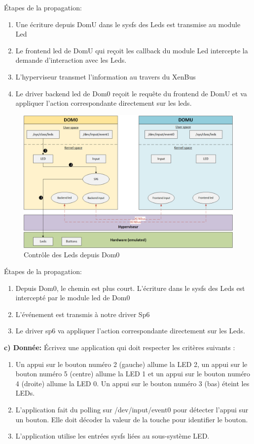 Étapes de la propagation:
\begin{enumerate}
	\item Une écriture depuis DomU dans le sysfs des Leds est transmise au module Led
	\item Le frontend led de DomU qui reçoit les callback du module Led intercepte la demande d'interaction avec les Leds.
	\item L'hyperviseur transmet l'information au travers du XenBus
	\item Le driver backend led de Dom0 reçoit le requête du frontend de DomU et va appliquer l'action correspondante directement sur les leds.
\end{enumerate}
\begin{figure}[H]
	\begin{center}
		\includegraphics[width=17cm]{img/virt4.png}
		\caption{Contrôle des Leds depuis Dom0}
		\label{virt4}
	\end{center}
\end{figure}
Étapes de la propagation:
\begin{enumerate}
	\item Depuis Dom0, le chemin est plus court. L'écriture dans le sysfs des Leds est intercepté par le module led de Dom0
	\item L'événement est transmis à notre driver Sp6
	\item Le driver sp6 va appliquer l'action correspondante directement sur les Leds.\\
\end{enumerate}
\textbf{c) Donnée: }Écrivez une application qui doit respecter les critères suivants :
\begin{enumerate}
	\item Un appui sur le bouton numéro 2 (gauche) allume la LED 2, un appui sur le bouton numéro 5 (centre)
	allume la LED 1 et un appui sur le bouton numéro 4 (droite) allume la LED 0. Un appui sur le
	bouton numéro 3 (bas) éteint les LEDs.
	\item L’application fait du polling sur /dev/input/event0 pour détecter l’appui sur un bouton. Elle
	doit décoder la valeur de la touche pour identifier le bouton.
	\item L’application utilise les entrées sysfs liées au sous-système LED.
\end{enumerate}
